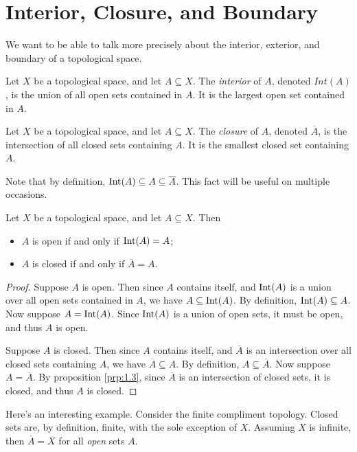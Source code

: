 \chapter{Interior, Closure, and Boundary}
We want to be able to talk more precisely about the interior, exterior, and boundary of a topological space.
\begin{definition}[Interior]\label{dfn:2.1}
	Let $X$ be a topological space, and let $A\subseteq X$. The \emph{interior} of $A$, denoted $Int(A)$, is the union of all open sets contained in $A$. It is the largest open set contained in $A$.
\end{definition}
\begin{definition}[Closure]\label{dfn:2.2}
	Let $X$ be a topological space, and let $A\subseteq X$. The \emph{closure} of $A$, denoted $\overline{A} $, is the intersection of all closed sets containing $A$. It is the smallest closed set containing $A$.
\end{definition}
Note that by definition, $\operatorname{Int}(A)\subseteq A\subseteq \overline{A} $. This fact will be useful on multiple occasions.
\begin{proposition}\label{prp:2.1}
	Let $X$ be a topological space, and let $A\subseteq X$. Then
	\begin{itemize}
		\item $A$ is open if and only if $\operatorname{Int}(A)=A$;
		\item $A$ is closed if and only if $\overline{A} =A$.
	\end{itemize}
\end{proposition}
\begin{proof}
	Suppose $A$ is open. Then since $A$ contains itself, and $\operatorname{Int}(A)$ is a union over all open sets contained in $A$, we have $A\subseteq \operatorname{Int}(A)$. By definition, $\operatorname{Int}(A)\subseteq A$. Now suppose $A=\operatorname{Int}(A)$. Since $\operatorname{Int}(A)$ is a union of open sets, it must be open, and thus $A $ is open.

	Suppose $A$ is closed. Then since $A$ contains itself, and $\overline{A} $ is an intersection over all closed sets containing $A$, we have $\overline{A} \subseteq A$. By definition, $A\subseteq \overline{A} $. Now suppose $A=\overline{A} $. By proposition \ref{prp:1.3}, since $\overline{A} $ is an intersection of closed sets, it is closed, and thus $A $ is closed.
\end{proof}

Here's an interesting example. Consider the finite compliment topology. Closed sets are, by definition, finite, with the sole exception of $X$. Assuming $X$ is infinite, then $\overline{A} =X$ for all \emph{open} sets $A$.


